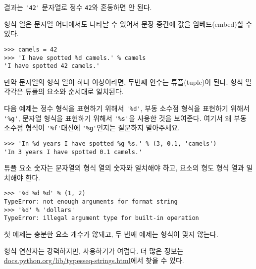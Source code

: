 결과는 \verb"'42'" 문자열로 정수 {\tt 42}와 혼동하면 안 된다.

형식 열은 문자열 어디에서도 나타날 수 있어서 문장 중간에 값을 임베드(embed)할 수 있다.

\beforeverb
\begin{verbatim}
>>> camels = 42
>>> 'I have spotted %d camels.' % camels
'I have spotted 42 camels.'
\end{verbatim}
\afterverb
%

만약 문자열의 형식 열이 하나 이상이라면, 두번째 인수는 튜플(tuple)이 된다.
형식 열 각각은 튜플의 요소와 순서대로 일치된다.

다음 예제는 정수 형식을 표현하기 위해서 \verb"'%d'", 부동 소수점 형식을 표현하기 위해서 \verb"'%g'",
문자열 형식을 표현하기 위해서 \verb"'%s'"을 사용한 것을 보여준다. 여기서 왜 부동 소수점 형식이  \verb"'%f'"대신에 \verb"'%g'"인지는 질문하지 말아주세요.

\beforeverb
\begin{verbatim}
>>> 'In %d years I have spotted %g %s.' % (3, 0.1, 'camels')
'In 3 years I have spotted 0.1 camels.'
\end{verbatim}
\afterverb
%

튜플 요소 숫자는 문자열의 형식 열의 숫자와 일치해야 하고, 요소의 형도 형식 열과 일치해야 한다.


\beforeverb
\begin{verbatim}
>>> '%d %d %d' % (1, 2)
TypeError: not enough arguments for format string
>>> '%d' % 'dollars'
TypeError: illegal argument type for built-in operation
\end{verbatim}
\afterverb
%

첫 예제는 충분한 요소 개수가 않돼고, 두 번째 예제는 형식이 맞지 않는다.

형식 연산자는 강력하지만, 사용하기가 여럽다. 더 많은 정보는 
\url{docs.python.org/lib/typesseq-strings.html}에서 찾을 수 있다.




